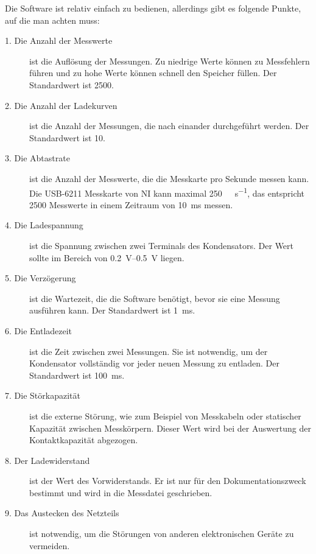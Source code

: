 Die Software ist relativ einfach zu bedienen, allerdings gibt es folgende Punkte, auf die man achten muss:
\begin{description}
    \item[1. Die Anzahl der Messwerte] ist die Auflösung der Messungen.
        Zu niedrige Werte können zu Messfehlern führen und zu hohe Werte können schnell den Speicher füllen.
        Der Standardwert ist \num{2500}.

    \item[2. Die Anzahl der Ladekurven] ist die Anzahl der Messungen, die nach einander durchgeführt werden.
        Der Standardwert ist \num{10}.

    \item[3. Die Abtastrate] ist die Anzahl der Messwerte, die die Messkarte pro Sekunde messen kann.
        Die USB-6211 Messkarte von NI kann maximal \SI[per-mode=symbol]{250}{\kilo\sample\per\second}, das entspricht \num{2500} Messwerte in einem Zeitraum von \SI{10}{\milli\second} messen.

    \item[4. Die Ladespannung] ist die Spannung zwischen zwei Terminals des Kondensators.
        Der Wert sollte im Bereich von \SIrange{0.2}{0.5}{\volt} liegen.

    \item[5. Die Verzögerung] ist die Wartezeit, die die Software benötigt, bevor sie eine Messung ausführen kann.
        Der Standardwert ist \SI{1}{\ms}.

    \item[6. Die Entladezeit] ist die Zeit zwischen zwei Messungen.
        Sie ist notwendig, um der Kondensator vollständig vor jeder neuen Messung zu entladen.
        Der Standardwert ist \SI{100}{\ms}.

    \item[7. Die Störkapazität] ist die externe Störung, wie zum Beispiel von Messkabeln oder statischer Kapazität zwischen Messkörpern.
        Dieser Wert wird bei der Auswertung der Kontaktkapazität abgezogen.

    \item[8. Der Ladewiderstand] ist der Wert des Vorwiderstands.
        Er ist nur für den Dokumentationszweck bestimmt und wird in die Messdatei geschrieben.

    \item[9. Das Austecken des Netzteils] ist notwendig, um die Störungen von anderen elektronischen Geräte zu vermeiden.
\end{description}

